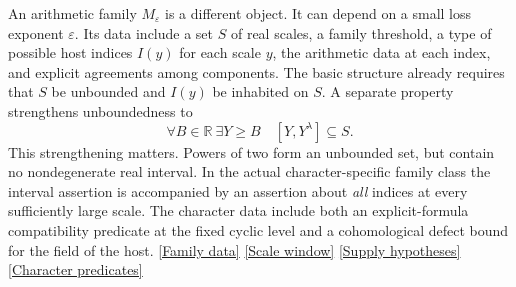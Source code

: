 \documentclass[12pt,letterpaper]{article}
\begin{document}
An arithmetic family \(M_\varepsilon\) is a different object. It can depend on a small loss exponent \(\varepsilon\). Its data include a set \(S\) of real scales, a family threshold, a type of possible host indices \(I(y)\) for each scale \(y\), the arithmetic data at each index, and explicit agreements among components. The basic structure already requires that \(S\) be unbounded and \(I(y)\) be inhabited on \(S\). A separate property strengthens unboundedness to
\begin{equation}
 \forall B\in\mathbb R\ \exists Y\ge B\quad [Y,Y^\lambda]\subseteq S .
 \label{eq:arith-full}
\end{equation}
This strengthening matters. Powers of two form an unbounded set, but contain no nondegenerate real interval. In the actual character-specific family class the interval assertion is accompanied by an assertion about \emph{all} indices at every sufficiently large scale. The character data include both an explicit-formula compatibility predicate at the fixed cyclic level and a cohomological defect bound for the field of the host. \href{https://github.com/nousentllc/riemann-hypothesis/blob/40e56bab026552e089d7afcfeff08d2defb9c005/src/Formalism/SharpRestriction/FamCore.lean#L71-L95}{\textsf{[Family data]}} \href{https://github.com/nousentllc/riemann-hypothesis/blob/40e56bab026552e089d7afcfeff08d2defb9c005/src/Formalism/SharpRestriction/FamCore.lean#L155-L156}{\textsf{[Scale window]}} \href{https://github.com/nousentllc/riemann-hypothesis/blob/40e56bab026552e089d7afcfeff08d2defb9c005/src/Development/AutomorphicArithmetic/CharacterBoxes/Supply.lean#L22-L23}{\textsf{[Supply hypotheses]}} \href{https://github.com/nousentllc/riemann-hypothesis/blob/40e56bab026552e089d7afcfeff08d2defb9c005/src/Development/AutomorphicArithmetic/CharacterBoxes/Supply.lean#L42-L44}{\textsf{[Character predicates]}}
\end{document}
